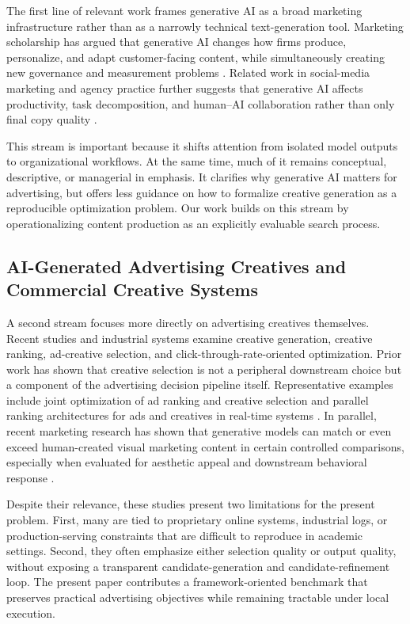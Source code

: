\documentclass[applsci,article,submit,pdftex,moreauthors]{Definitions/mdpi}
\begin{document}
The first line of relevant work frames generative AI as a broad marketing infrastructure rather than as a narrowly technical text-generation tool. Marketing scholarship has argued that generative AI changes how firms produce, personalize, and adapt customer-facing content, while simultaneously creating new governance and measurement problems \citep{grewal2025,heitmann2024}. Related work in social-media marketing and agency practice further suggests that generative AI affects productivity, task decomposition, and human--AI collaboration rather than only final copy quality \citep{gastmann2025,cui2025}.

This stream is important because it shifts attention from isolated model outputs to organizational workflows. At the same time, much of it remains conceptual, descriptive, or managerial in emphasis. It clarifies why generative AI matters for advertising, but offers less guidance on how to formalize creative generation as a reproducible optimization problem. Our work builds on this stream by operationalizing content production as an explicitly evaluable search process.

\subsection{AI-Generated Advertising Creatives and Commercial Creative Systems}

A second stream focuses more directly on advertising creatives themselves. Recent studies and industrial systems examine creative generation, creative ranking, ad-creative selection, and click-through-rate-oriented optimization. Prior work has shown that creative selection is not a peripheral downstream choice but a component of the advertising decision pipeline itself. Representative examples include joint optimization of ad ranking and creative selection and parallel ranking architectures for ads and creatives in real-time systems \citep{lin2022,yang2024aaai}. In parallel, recent marketing research has shown that generative models can match or even exceed human-created visual marketing content in certain controlled comparisons, especially when evaluated for aesthetic appeal and downstream behavioral response \citep{hartmann2025}.

Despite their relevance, these studies present two limitations for the present problem. First, many are tied to proprietary online systems, industrial logs, or production-serving constraints that are difficult to reproduce in academic settings. Second, they often emphasize either selection quality or output quality, without exposing a transparent candidate-generation and candidate-refinement loop. The present paper contributes a framework-oriented benchmark that preserves practical advertising objectives while remaining tractable under local execution.
\end{document}
